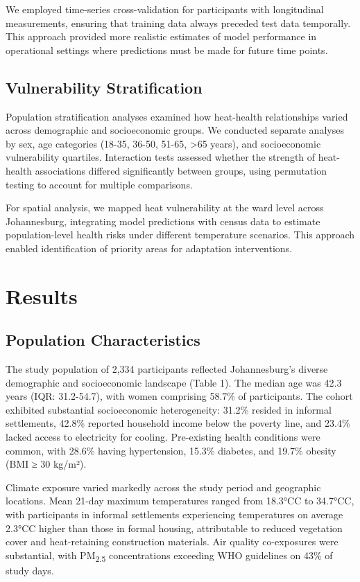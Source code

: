 \documentclass[11pt,a4paper]{article}
\newcommand{\degrees}{°C}
\begin{document}
We employed time-series cross-validation for participants with longitudinal measurements, ensuring that training data always preceded test data temporally. This approach provided more realistic estimates of model performance in operational settings where predictions must be made for future time points.

\subsection{Vulnerability Stratification}

Population stratification analyses examined how heat-health relationships varied across demographic and socioeconomic groups. We conducted separate analyses by sex, age categories (18-35, 36-50, 51-65, >65 years), and socioeconomic vulnerability quartiles. Interaction tests assessed whether the strength of heat-health associations differed significantly between groups, using permutation testing to account for multiple comparisons.

For spatial analysis, we mapped heat vulnerability at the ward level across Johannesburg, integrating model predictions with census data to estimate population-level health risks under different temperature scenarios. This approach enabled identification of priority areas for adaptation interventions.

\section{Results}

\subsection{Population Characteristics}

The study population of 2,334 participants reflected Johannesburg's diverse demographic and socioeconomic landscape (Table 1). The median age was 42.3 years (IQR: 31.2-54.7), with women comprising 58.7\% of participants. The cohort exhibited substantial socioeconomic heterogeneity: 31.2\% resided in informal settlements, 42.8\% reported household income below the poverty line, and 23.4\% lacked access to electricity for cooling. Pre-existing health conditions were common, with 28.6\% having hypertension, 15.3\% diabetes, and 19.7\% obesity (BMI ≥ 30 kg/m²).

Climate exposure varied markedly across the study period and geographic locations. Mean 21-day maximum temperatures ranged from 18.3\degrees C to 34.7\degrees C, with participants in informal settlements experiencing temperatures on average 2.3\degrees C higher than those in formal housing, attributable to reduced vegetation cover and heat-retaining construction materials. Air quality co-exposures were substantial, with PM\textsubscript{2.5} concentrations exceeding WHO guidelines on 43\% of study days.
\end{document}
